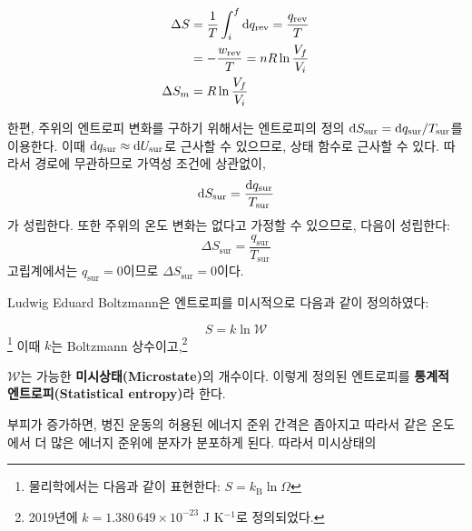         \begin{equation*}
            \begin{aligned}
                \Delta S &= \frac{1}{T}\int_{i}^{f}\operatorname{d\!} q_{\mathrm{rev}} = \frac{q_\mathrm{rev}}{T} \\
                &= -\frac{w_{\mathrm{rev}}}{T} = nR \ln{\frac{V_f}{V_i}} \\
                \Delta S_m &= R \ln{\frac{V_f}{V_i}}
            \end{aligned}
        \end{equation*}
        \par 한편, 주위의 엔트로피 변화를 구하기 위해서는 엔트로피의 정의 $\displaystyle\operatorname{d\!} S_\mathrm{sur} = \operatorname{d\!} q_\mathrm{sur} / T_\mathrm{sur}$를 
        이용한다. 이때 $\displaystyle\operatorname{d\!} q_\mathrm{sur} \approx \operatorname{d\!} U_{\mathrm{sur}}$로 근사할 수 있으므로, 상태 함수로 근사할 수 있다. 따라서 
        경로에 무관하므로 가역성 조건에 상관없이,
        \begin{equation*}
            \operatorname{d\!} S_\mathrm{sur} = \frac{\operatorname{d\!} q_\mathrm{sur}}{T_\mathrm{sur}}
        \end{equation*}
        가 성립한다. 또한 주위의 온도 변화는 없다고 가정할 수 있으므로, 다음이 성립한다:
        \begin{equation*}
            \Delta S_\mathrm{sur} = \frac{q_\mathrm{sur}}{T_\mathrm{sur}}
        \end{equation*}
        고립계에서는 $q_\mathrm{sur} = 0$이므로 $\Delta S_\mathrm{sur} = 0$이다.
        \par Ludwig Eduard Boltzmann은 엔트로피를 미시적으로 다음과 같이 정의하였다:
        \begin{defn}
        \begin{equation*}
            S = k \ln{\mathcal{W}}
        \end{equation*}\footnote[9]{%
        물리학에서는 다음과 같이 표현한다: $\displaystyle S = k_\mathrm{B} \ln{\Omega}$}
        이때 $k$는 Boltzmann 상수이고,\footnote[10]{2019년에 $k = 1.380\,649 \times 10^{-23}$ J K$^{-1}$로 정의되었다.}
        \end{defn}
        $\mathcal{W}$는 가능한 
        \textbf{미시상태(Microstate)}의 개수이다. 이렇게 정의된 엔트로피를 \textbf{통계적 엔트로피(Statistical entropy)}라 한다.
        \par 부피가 증가하면, 병진 운동의 허용된 에너지 준위 간격은 좁아지고 따라서 같은 온도에서 더 많은 에너지 준위에 분자가 분포하게 된다. 따라서 미시상태의 
